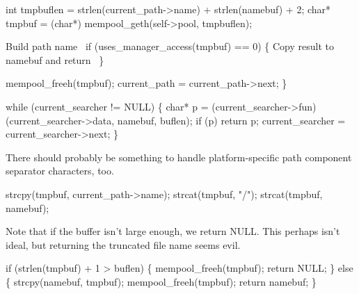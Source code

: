     int tmpbuflen = strlen(current_path->name) +
                    strlen(namebuf) + 2;
    char* tmpbuf = (char*) mempool_geth(self->pool, tmpbuflen);

    \LA{}Build path name~{\nwtagstyle{}}\RA{}
    if (uses_manager_access(tmpbuf) == 0) \{
        \LA{}Copy result to namebuf and return~{\nwtagstyle{}}\RA{}
    \}
    
    mempool_freeh(tmpbuf);
    current_path = current_path->next;
\}

\nwendcode{}\nwdocspar

\nwenddocs{}\endmoddef\nwstartdeflinemarkup{}\nwenddeflinemarkup
while (current_searcher != NULL) \{
    char* p = (current_searcher->fun)(current_searcher->data, namebuf, buflen);
    if (p) 
        return p;
    current_searcher = current_searcher->next;
\}

\nwendcode{}\nwdocspar

There should probably be something to handle platform-specific
path component separator characters, too.

\nwenddocs{}\endmoddef\nwstartdeflinemarkup{}\nwenddeflinemarkup
strcpy(tmpbuf, current_path->name);
strcat(tmpbuf, "/");
strcat(tmpbuf, namebuf);
\nwendcode{}\nwdocspar

Note that if the buffer isn't large enough, we return NULL.
This perhaps isn't ideal, but returning the truncated file name
seems evil.

\nwenddocs{}\endmoddef\nwstartdeflinemarkup{}\nwenddeflinemarkup
if (strlen(tmpbuf) + 1 > buflen) \{
    mempool_freeh(tmpbuf);
    return NULL;
\} else \{
    strcpy(namebuf, tmpbuf);
    mempool_freeh(tmpbuf);
    return namebuf;
\}
\nwendcode{}\nwdocspar


